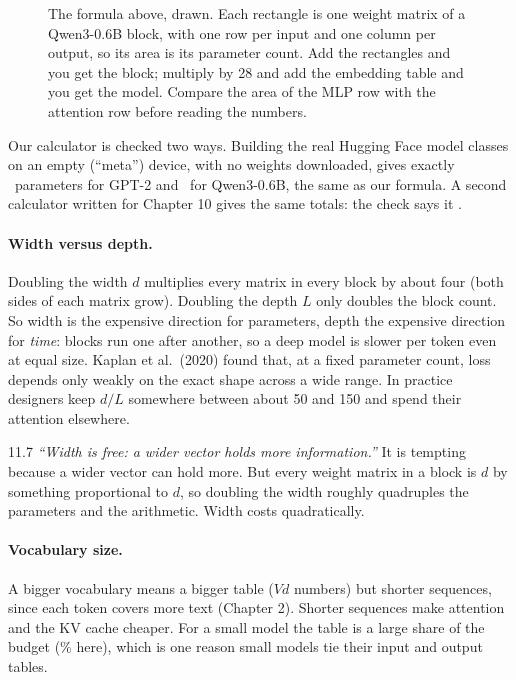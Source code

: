 \begin{figure}[!htb]
\centering

\caption{The formula above, drawn. Each rectangle is one weight matrix of a Qwen3-0.6B block, with one row per
input and one column per output, so its area is its parameter count. Add the rectangles and you get the
block; multiply by 28 and add the embedding table and you get the model. Compare the area of the MLP row with
the attention row before reading the numbers.}
\end{figure}

\Sanity Our calculator is checked two ways. Building the real Hugging Face model classes on an empty
(``meta'') device, with no weights downloaded, gives exactly \nElevenGptParams\ parameters for GPT-2 and
\nElevenQwenParams\ for Qwen3-0.6B, the same as our formula. A second calculator written for Chapter 10
gives the same totals: the check says it \nElevenCalcCheck.

\paragraph{Width versus depth.} Doubling the width $d$ multiplies every matrix in every block by about
four (both sides of each matrix grow). Doubling the depth $L$ only doubles the block count. So width is
the expensive direction for parameters, depth the expensive direction for \emph{time}: blocks run one after
another, so a deep model is slower per token even at equal size. Kaplan et al.\ (2020) found that, at a
fixed parameter count, loss depends only weakly on the exact shape across a wide range. In practice
designers keep $d/L$ somewhere between about 50 and 150 and spend their attention elsewhere.

\begin{wrongidea}{11.7}
\emph{``Width is free: a wider vector holds more information.''} It is tempting because a wider vector
can hold more. But every weight matrix in a block is $d$ by something proportional to $d$, so doubling
the width roughly quadruples the parameters and the arithmetic. Width costs quadratically.
\end{wrongidea}

\paragraph{Vocabulary size.} A bigger vocabulary means a bigger table ($Vd$ numbers) but shorter
sequences, since each token covers more text (Chapter 2). Shorter sequences make attention and the KV
cache cheaper. For a small model the table is a large share of the budget (\nElevenQwenEmbShare\% here),
which is one reason small models tie their input and output tables.

